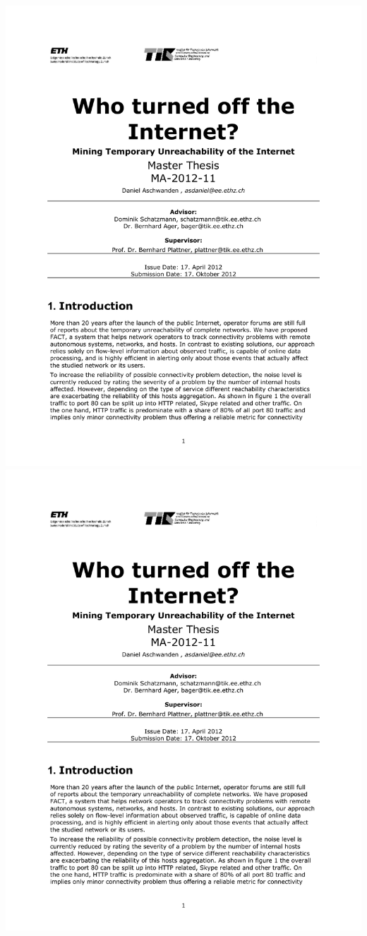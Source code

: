 \includegraphics[width=\linewidth, page=2]{ThesisDescription.pdf}
\newpage
\includegraphics[width=\linewidth, page=3]{ThesisDescription.pdf}
